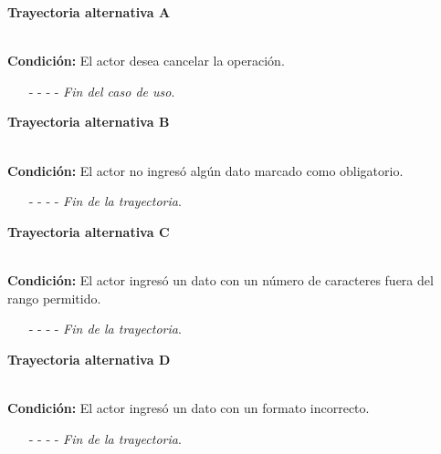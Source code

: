 \hypertarget{CU11-1-2:TAA}{\textbf{Trayectoria alternativa A}}\\
\noindent \textbf{Condición:} El actor desea cancelar la operación.
\begin{enumerate}
	\UCpaso[\UCactor] Solicita cancelar la operación oprimiendo el botón  de la pantalla .
	\UCpaso[\UCsist] Muestra la pantalla  o .
	\item[- -] - - {\em {Fin del caso de uso}}.%
\end{enumerate}
\hypertarget{CU11-1-2:TAB}{\textbf{Trayectoria alternativa B}}\\
\noindent \textbf{Condición:} El actor no ingresó algún dato marcado como obligatorio.
\begin{enumerate}
	\UCpaso[\UCsist] Muestra el mensaje  señalando el campo que presenta el error en la pantalla .
	\UCpaso Regresa al paso \ref{CU11.1.2-P4} de la trayectoria principal.
	\item[- -] - - {\em {Fin de la trayectoria}}.%
\end{enumerate}
\hypertarget{CU11-1-2:TAC}{\textbf{Trayectoria alternativa C}}\\
\noindent \textbf{Condición:} El actor ingresó un dato con un número de caracteres fuera del rango permitido.
\begin{enumerate}
	\UCpaso[\UCsist] Muestra el mensaje  señalando el campo que presenta el error en la pantalla .
	\UCpaso Regresa al paso \ref{CU11.1.2-P4} de la trayectoria principal.
	\item[- -] - - {\em {Fin de la trayectoria}}.%
\end{enumerate}
\hypertarget{CU11-1-2:TAD}{\textbf{Trayectoria alternativa D}}\\
\noindent \textbf{Condición:} El actor ingresó un dato con un formato incorrecto.
\begin{enumerate}
	\UCpaso[\UCsist] Muestra el mensaje  señalando el campo que presenta el error en la pantalla .
	\UCpaso Regresa al paso \ref{CU11.1.2-P4} de la trayectoria principal.
	\item[- -] - - {\em {Fin de la trayectoria}}.
\end{enumerate}
